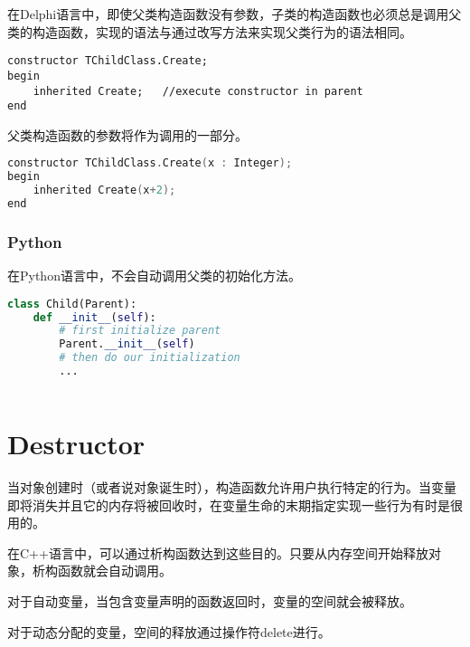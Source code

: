 在Delphi语言中，即使父类构造函数没有参数，子类的构造函数也必须总是调用父类的构造函数，实现的语法与通过改写方法来实现父类行为的语法相同。


\begin{lstlisting}[language=Delphi]
constructor TChildClass.Create;
begin
	inherited Create;	//execute constructor in parent
end
\end{lstlisting}

父类构造函数的参数将作为调用的一部分。

\begin{lstlisting}[language=C++]
constructor TChildClass.Create(x : Integer);
begin
	inherited Create(x+2);
end
\end{lstlisting}

\subsection{Python}

在Python语言中，不会自动调用父类的初始化方法。


\begin{lstlisting}[language=Python]
class Child(Parent):
	def __init__(self):
		# first initialize parent
		Parent.__init__(self)
		# then do our initialization
		...
\end{lstlisting}


\begin{lstlisting}[language=C++]

\end{lstlisting}



\chapter{Destructor}



当对象创建时（或者说对象诞生时），构造函数允许用户执行特定的行为。当变量即将消失并且它的内存将被回收时，在变量生命的末期指定实现一些行为有时是很用的。

在C++语言中，可以通过析构函数达到这些目的。只要从内存空间开始释放对象，析构函数就会自动调用。

\begin{compactitem}
\item 对于自动变量，当包含变量声明的函数返回时，变量的空间就会被释放。
\item 对于动态分配的变量，空间的释放通过操作符delete进行。
\end{compactitem}

